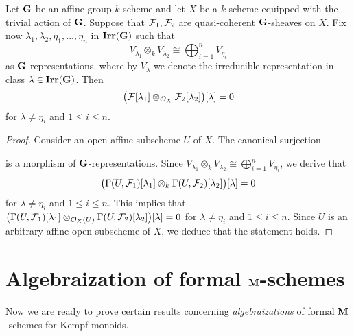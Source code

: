 \begin{fact}\label{fact:tensor_product_of_isotypic_components}
Let $\mathbf{G}$ be an affine group $k$-scheme and let $X$ be a $k$-scheme equipped with the trivial action of $\mathbf{G}$. Suppose that ${\mathcal F}_1,{\mathcal F}_2$ are quasi-coherent $\mathbf{G}$-sheaves on $X$. Fix now $\lambda_1,\lambda_2,\eta_1,...,\eta_n$ in $\mathbf{Irr}(\mathbf{G})$ such that
$$V_{\lambda_1}\otimes_k V_{\lambda_2} \cong \bigoplus_{i=1}^nV_{\eta_i}$$
as $\mathbf{G}$-representations, where by $V_{\lambda}$ we denote the irreducible representation in class $\lambda\in \mathbf{Irr}(\mathbf{G})$. Then
$$\big({\mathcal F}[\lambda_1]\otimes_{{\mathcal O}_X}{\mathcal F}_2[\lambda_2]\big)[\lambda] = 0$$
for $\lambda \neq \eta_i$ and $1\leq i\leq n$.
\end{fact}
\begin{proof}
Consider an open affine subscheme $U$ of $X$. The canonical surjection
\begin{center}
\end{center}
is a morphism of $\mathbf{G}$-representations. Since $V_{\lambda_1}\otimes_k V_{\lambda_2} \cong \bigoplus_{i=1}^nV_{\eta_i}$, we derive that
$$\big(\Gamma(U,{\mathcal F}_1)[\lambda_1] \otimes_k \Gamma(U,{\mathcal F}_2)[\lambda_2]\big)[\lambda] = 0$$
for $\lambda \neq \eta_i$ and $1\leq i\leq n$. This implies that $\big(\Gamma(U,{\mathcal F}_1)[\lambda_1] \otimes_{{\mathcal O}_X(U)} \Gamma(U,{\mathcal F}_2)[\lambda_2]\big)[\lambda] = 0$ for $\lambda \neq \eta_i$ and $1\leq i\leq n$. Since $U$ is an arbitrary affine open subscheme of $X$, we deduce that the statement holds.
\end{proof}

\section{Algebraization of formal $\mathbf{M}$-schemes}
\noindent
Now we are ready to prove certain results concerning \textit{algebraizations} of formal $\mathbf{M}$-schemes for Kempf monoids.


